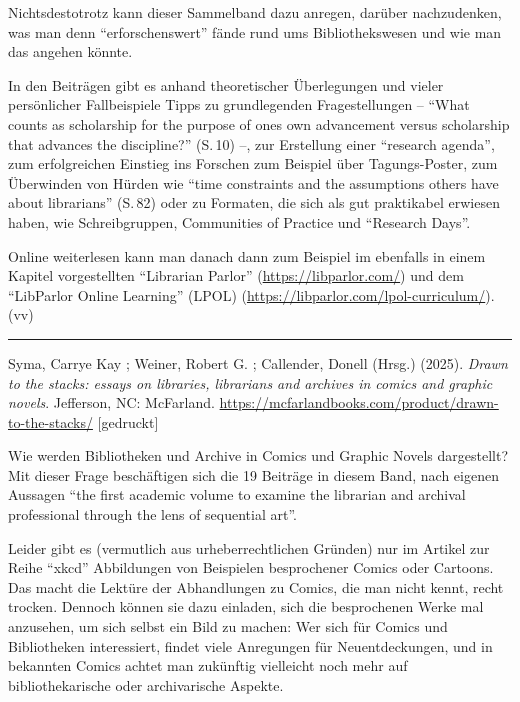 \documentclass[a4paper,
fontsize=11pt,
oneside,
numbers=noperiodatend,
parskip=half-,
bibliography=totoc,
final
]{scrartcl}
\begin{document}
Nichtsdestotrotz kann dieser Sammelband dazu anregen, darüber
nachzudenken, was man denn \enquote{erforschenswert} fände rund ums
Bibliothekswesen und wie man das angehen könnte.

In den Beiträgen gibt es anhand theoretischer Überlegungen und vieler
persönlicher Fallbeispiele Tipps zu grundlegenden Fragestellungen --
\enquote{What counts as scholarship for the purpose of
one\textquotesingle s own advancement versus scholarship that advances
the discipline?} (S.\,10) --, zur Erstellung einer \enquote{research
agenda}, zum erfolgreichen Einstieg ins Forschen zum Beispiel über
Tagungs-Poster, zum Überwinden von Hürden wie \enquote{time constraints
and the assumptions others have about librarians} (S.\,82) oder zu
Formaten, die sich als gut praktikabel erwiesen haben, wie
Schreibgruppen, Communities of Practice und \enquote{Research Days}.

Online weiterlesen kann man danach dann zum Beispiel im ebenfalls in
einem Kapitel vorgestellten \enquote{Librarian Parlor}
(\href{https://deref-gmx.net/mail/client/8FHQ-s1Iumk/dereferrer/?redirectUrl=https\%3A\%2F\%2Flibparlor.com\%2F}{https://libparlor.com/})
und dem \enquote{LibParlor Online Learning} (LPOL)
(\href{https://deref-gmx.net/mail/client/oua9uIDXFEA/dereferrer/?redirectUrl=https\%3A\%2F\%2Flibparlor.com\%2Flpol-curriculum\%2F}{https://libparlor.com/lpol-curriculum/}).
(vv)

\begin{center}\rule{0.5\linewidth}{0.5pt}\end{center}

Syma, Carrye Kay ; Weiner, Robert G. ; Callender, Donell (Hrsg.) (2025).
\emph{Drawn to the stacks: essays on libraries, librarians and archives
in comics and graphic novels}. Jefferson, NC: McFarland.
\url{https://mcfarlandbooks.com/product/drawn-to-the-stacks/}
{[}gedruckt{]}

Wie werden Bibliotheken und Archive in Comics und Graphic Novels
dargestellt? Mit dieser Frage beschäftigen sich die 19 Beiträge in
diesem Band, nach eigenen Aussagen \enquote{the first academic volume to
examine the librarian and archival professional through the lens of
sequential art}.

Leider gibt es (vermutlich aus urheberrechtlichen Gründen) nur im
Artikel zur Reihe \enquote{xkcd} Abbildungen von Beispielen besprochener
Comics oder Cartoons. Das macht die Lektüre der Abhandlungen zu Comics,
die man nicht kennt, recht trocken. Dennoch können sie dazu einladen,
sich die besprochenen Werke mal anzusehen, um sich selbst ein Bild zu
machen: Wer sich für Comics und Bibliotheken interessiert, findet viele
Anregungen für Neuentdeckungen, und in bekannten Comics achtet man
zukünftig vielleicht noch mehr auf bibliothekarische oder archivarische
Aspekte.
\end{document}
